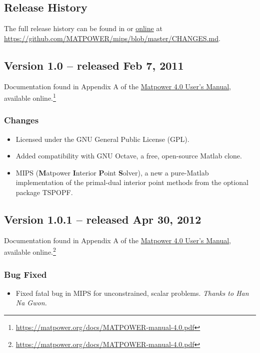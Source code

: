 \documentclass[12pt]{article}
\newcommand{\matlab}[0]{{\sc Matlab}}
\newcommand{\matpower}[0]{{\sc Matpower}}
\newcommand{\mips}[0]{{MIPS}}
\newcommand{\mipsname}[0]{{{\bf M}{\sc atpower} \textbf{I}nterior \textbf{P}oint \textbf{S}olver}}
\newcommand{\code}[1]{{\relsize{-0.5}{\tt{{#1}}}}}  %
\numberwithin{equation}{section}
\numberwithin{table}{section}
\numberwithin{figure}{section}
\begin{document}
\begin{appendices}
\clearpage
\section{Release History}
\label{app:release_history}

The full release history can be found in \code{CHANGES.md} or \href{https://github.com/MATPOWER/mips/blob/master/CHANGES.md}{online} at \url{https://github.com/MATPOWER/mips/blob/master/CHANGES.md}.


\subsection{Version 1.0 -- released Feb 7, 2011}
\label{app:v10}

Documentation found in Appendix A of the \href{https://matpower.org/docs/MATPOWER-manual-4.0.pdf}{\matpower{} 4.0 User's Manual}, available online.\footnote{\url{https://matpower.org/docs/MATPOWER-manual-4.0.pdf}}

\subsubsection*{Changes}
\begin{itemize}
\item Licensed under the GNU General Public License (GPL).
\item Added compatibility with GNU Octave, a free, open-source \matlab{} clone.
\item \mips{} (\mipsname{}), a new a pure-\matlab{} implementation of the primal-dual interior point methods from the optional package TSPOPF.
\end{itemize}


\subsection{Version 1.0.1 -- released Apr 30, 2012}
\label{app:v101}

Documentation found in Appendix A of the \href{https://matpower.org/docs/MATPOWER-manual-4.0.pdf}{\matpower{} 4.0 User's Manual}, available online.\footnote{\url{https://matpower.org/docs/MATPOWER-manual-4.0.pdf}}

\subsubsection*{Bug Fixed}
\begin{itemize}
\item Fixed fatal bug in \mips{} for unconstrained, scalar problems. \emph{Thanks to Han Na Gwon.}
\end{itemize}



\end{appendices}
\end{document}
